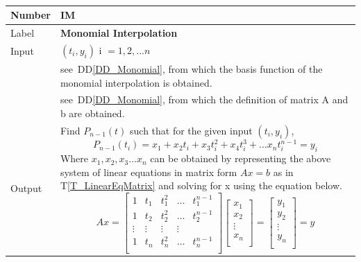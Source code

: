 \documentclass[12pt]{article}
\newcommand{\colAwidth}{0.13\textwidth}
\newcommand{\colBwidth}{0.82\textwidth}
\newcommand{\ddref}[1]{DD\ref{#1}}
\newcommand{\tref}[1]{T\ref{#1}}
\newcounter{instnum} %
\begin{document}
~\newline
\noindent
\begin{minipage}{\textwidth}
	\renewcommand*{\arraystretch}{1.5}
	\begin{tabular}{| p{\colAwidth} | p{\colBwidth}|}
		\hline
		\rowcolor[gray]{0.9}
		Number
		& IM{instnum}\theinstnum \label{IM_Monomial}\\
		\hline
		
		Label
		& \bf Monomial Interpolation\\
		\hline
		
		Input
		& $(t_i,y_i)$ i $= {1,2,...n}$\\
		& see~\ddref{DD_Monomial}, from which the basis function of the monomial interpolation is obtained.\\
		& see~\ddref{DD_Monomial}, from which the definition of matrix A and b are obtained.\\
		\hline
		
		Output
		&Find $P_{n-1}(t)$ such that for the given input $(t_i,y_i)$,
		\begin{equation*}
		P_{n-1}(t_i) = x_1 + x_2 t_i + x_3 t_i ^2 + x_4 t_i ^3 + ... x_n t_i ^{n-1} = y_i 
		\end{equation*}
		Where $x_1, x_2, x_3 ... x_n$ can be obtained by representing the above system of linear equations in matrix form $Ax = b$ as in \tref{T_LinearEqMatrix} and solving for x using the equation below.
		\begin{equation*}
		Ax = \begin{bmatrix}
		1 & t_{1} & t_{1} ^2 & \dots & t_{1} ^{n-1} \\
		1 & t_{2} & t_{2} ^2 & \dots & t_{2} ^{n-1} \\
		\vdots & \vdots & \vdots & \vdots \\
		1 & t_{n} & t_{n} ^2 & \dots & t_{n} ^{n-1} \\
		\end{bmatrix}
		\begin{bmatrix}
		x_1  \\
		x_2 \\
		\vdots \\
		x_n \\
		\end{bmatrix} = 
		\begin{bmatrix}
		y_1  \\
		y_2 \\
		\vdots \\
		y_n \\
		\end{bmatrix} = y
		\end{equation*}\\ 
	

\end{tabular}
\end{minipage}
\end{document}
